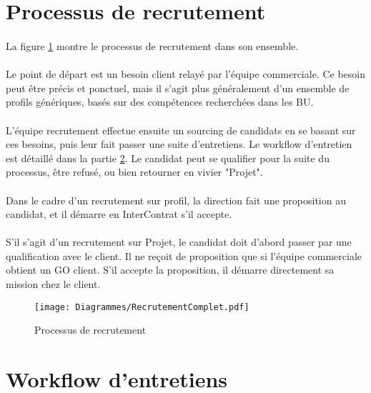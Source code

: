 \section{Processus de recrutement}

\paragraph{} La figure \ref{recrutementFull} montre le processus de recrutement dans son ensemble.
\paragraph{} Le point de départ est un besoin client relayé par l'équipe commerciale. Ce besoin peut être précis et ponctuel, mais il s'agit plus généralement d'un ensemble de profils génériques, basés sur des compétences recherchées dans les BU.
\paragraph{} L'équipe recrutement effectue ensuite un sourcing de candidats en se basant sur ces besoins, puis leur fait passer une suite d'entretiens. Le workflow d'entretien est détaillé dans la partie \ref{sec:entretiens}. Le candidat peut se qualifier pour la suite du processus, être refusé, ou bien retourner en vivier "Projet".
\paragraph{} Dans le cadre d'un recrutement sur profil, la direction fait une proposition au candidat, et il démarre en InterContrat s'il accepte.
\paragraph{} S'il s'agit d'un recrutement sur Projet, le candidat doit d'abord passer par une qualification avec le client. Il ne reçoit de proposition que si l'équipe commerciale obtient un GO client. S'il accepte la proposition, il démarre directement sa mission chez le client.

\begin{figure}
	\centering
	\begin{sideways}
	\texttt{[image: Diagrammes/RecrutementComplet.pdf]}
	\end{sideways}
	\caption{Processus de recrutement}
	\label{recrutementFull}	
\end{figure}

\section{Workflow d'entretiens}
\label{sec:entretiens}

